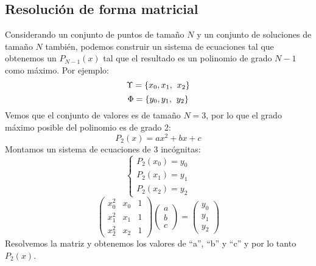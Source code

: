 \subsection{Resolución de forma matricial}
\noindent Considerando un conjunto de puntos de tamaño \(N\) y un conjunto de soluciones de tamaño \(N\) también, podemos construir un sistema de ecuaciones tal que obtenemos un \(P_{N-1}(x)\) tal que el resultado es un polinomio de grado \(N-1\) como máximo. Por ejemplo:
\[
        \Large{\Upsilon} = \left \{ x_0, x_1, \right. \left. x_2 \right \}
\]
\[
        \Large{\Phi}= \left \{ y_0, y_1, \right. \left. y_2 \right \}
\]
\noindent Vemos que el conjunto de valores es de tamaño \(N = 3\), por lo que el grado máximo posible del polinomio es de grado 2:
\[
        P_2(x) = ax^2 + bx + c
\]
\noindent Montamos un sistema de ecuaciones de 3 incógnitas:
\[
        \begin{cases}
                P_2(x_0) = y_0
                \\
                P_2(x_1) = y_1
                \\
                P_2(x_2) = y_2
        \end{cases}
\]
\[
        \begin{pmatrix}
                x^2_0 & x_0 & 1 \\
                x^2_1 & x_1 & 1 \\
                x^2_2 & x_2 & 1
        \end{pmatrix}
        \begin{pmatrix}
                a
                \\
                b
                \\
                c
        \end{pmatrix}
        =
        \begin{pmatrix}
                y_0
                \\
                y_1
                \\
                y_2
        \end{pmatrix}
\]
\noindent Resolvemos la matriz y obtenemos los valores de ``a'', ``b'' y ``c'' y por lo tanto \(P_2(x)\).
